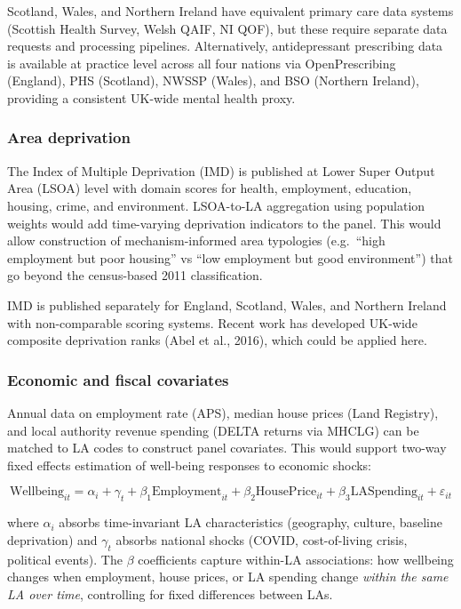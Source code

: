 \documentclass[12pt,a4paper]{article}
\begin{document}
Scotland, Wales, and Northern Ireland have equivalent primary care data systems (Scottish Health Survey, Welsh QAIF, NI QOF), but these require separate data requests and processing pipelines. Alternatively, antidepressant prescribing data is available at practice level across all four nations via OpenPrescribing (England), PHS (Scotland), NWSSP (Wales), and BSO (Northern Ireland), providing a consistent UK-wide mental health proxy.

\subsubsection{Area deprivation}

The Index of Multiple Deprivation (IMD) is published at Lower Super Output Area (LSOA) level with domain scores for health, employment, education, housing, crime, and environment. LSOA-to-LA aggregation using population weights would add time-varying deprivation indicators to the panel. This would allow construction of mechanism-informed area typologies (e.g.\ ``high employment but poor housing'' vs ``low employment but good environment'') that go beyond the census-based 2011 classification.

IMD is published separately for England, Scotland, Wales, and Northern Ireland with non-comparable scoring systems. Recent work has developed UK-wide composite deprivation ranks (Abel et al., 2016), which could be applied here.

\subsubsection{Economic and fiscal covariates}

Annual data on employment rate (APS), median house prices (Land Registry), and local authority revenue spending (DELTA returns via MHCLG) can be matched to LA codes to construct panel covariates. This would support two-way fixed effects estimation of well-being responses to economic shocks:

\[
\text{Wellbeing}_{it} = \alpha_i + \gamma_t + \beta_1 \text{Employment}_{it} + \beta_2 \text{HousePrice}_{it} + \beta_3 \text{LASpending}_{it} + \varepsilon_{it}
\]

where $\alpha_i$ absorbs time-invariant LA characteristics (geography, culture, baseline deprivation) and $\gamma_t$ absorbs national shocks (COVID, cost-of-living crisis, political events). The $\beta$ coefficients capture within-LA associations: how wellbeing changes when employment, house prices, or LA spending change \textit{within the same LA over time}, controlling for fixed differences between LAs.
\end{document}
